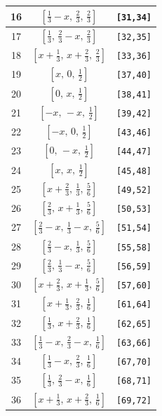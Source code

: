 \documentclass[fleqn,8pt]{jsarticle}
\begin{document}
\begin{longtable}{ccc}
16 & $\left[ \frac{1}{3} - x,\, \frac{2}{3},\, \frac{2}{3} \right]$ & {\tt [31,34]} \\ \hline
17 & $\left[ \frac{1}{3},\, \frac{2}{3} - x,\, \frac{2}{3} \right]$ & {\tt [32,35]} \\ \hline
18 & $\left[ x + \frac{1}{3},\, x + \frac{2}{3},\, \frac{2}{3} \right]$ & {\tt [33,36]} \\ \hline
19 & $\left[ x,\, 0,\, \frac{1}{2} \right]$ & {\tt [37,40]} \\ \hline
20 & $\left[ 0,\, x,\, \frac{1}{2} \right]$ & {\tt [38,41]} \\ \hline
21 & $\left[ - x,\, - x,\, \frac{1}{2} \right]$ & {\tt [39,42]} \\ \hline
22 & $\left[ - x,\, 0,\, \frac{1}{2} \right]$ & {\tt [43,46]} \\ \hline
23 & $\left[ 0,\, - x,\, \frac{1}{2} \right]$ & {\tt [44,47]} \\ \hline
24 & $\left[ x,\, x,\, \frac{1}{2} \right]$ & {\tt [45,48]} \\ \hline
25 & $\left[ x + \frac{2}{3},\, \frac{1}{3},\, \frac{5}{6} \right]$ & {\tt [49,52]} \\ \hline
26 & $\left[ \frac{2}{3},\, x + \frac{1}{3},\, \frac{5}{6} \right]$ & {\tt [50,53]} \\ \hline
27 & $\left[ \frac{2}{3} - x,\, \frac{1}{3} - x,\, \frac{5}{6} \right]$ & {\tt [51,54]} \\ \hline
28 & $\left[ \frac{2}{3} - x,\, \frac{1}{3},\, \frac{5}{6} \right]$ & {\tt [55,58]} \\ \hline
29 & $\left[ \frac{2}{3},\, \frac{1}{3} - x,\, \frac{5}{6} \right]$ & {\tt [56,59]} \\ \hline
30 & $\left[ x + \frac{2}{3},\, x + \frac{1}{3},\, \frac{5}{6} \right]$ & {\tt [57,60]} \\ \hline
31 & $\left[ x + \frac{1}{3},\, \frac{2}{3},\, \frac{1}{6} \right]$ & {\tt [61,64]} \\ \hline
32 & $\left[ \frac{1}{3},\, x + \frac{2}{3},\, \frac{1}{6} \right]$ & {\tt [62,65]} \\ \hline
33 & $\left[ \frac{1}{3} - x,\, \frac{2}{3} - x,\, \frac{1}{6} \right]$ & {\tt [63,66]} \\ \hline
34 & $\left[ \frac{1}{3} - x,\, \frac{2}{3},\, \frac{1}{6} \right]$ & {\tt [67,70]} \\ \hline
35 & $\left[ \frac{1}{3},\, \frac{2}{3} - x,\, \frac{1}{6} \right]$ & {\tt [68,71]} \\ \hline
36 & $\left[ x + \frac{1}{3},\, x + \frac{2}{3},\, \frac{1}{6} \right]$ & {\tt [69,72]} \\
\end{longtable}
\end{document}
